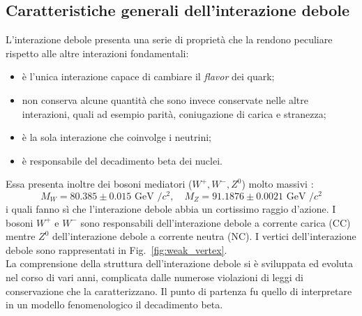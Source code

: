 \documentclass{subnucbo}
\begin{document}
\subsection{Caratteristiche generali dell'interazione debole}
L'interazione debole presenta una serie di proprietà che la rendono peculiare rispetto alle altre interazioni fondamentali:
\begin{itemize}
        \item è l'unica interazione capace di cambiare il \textit{flavor} dei quark;
        \item non conserva alcune quantità che sono invece conservate nelle altre interazioni, quali ad esempio parità, coniugazione di carica e stranezza;
        \item è la sola interazione che coinvolge i neutrini;
        \item è responsabile del decadimento beta dei nuclei.
\end{itemize}
Essa presenta inoltre dei bosoni mediatori ($W^{+}, W^{-}, Z^{0}$) molto massivi \cite{ref:PDG}:
\begin{equation}
        M _ { W } = 80.385 \pm 0.015 \text { GeV } / c ^ { 2 } , \quad M _ { Z } = 91.1876 \pm 0.0021 \text { GeV } / c ^ { 2 }
        \label{eq:bosons_masses}
\end{equation}
i quali fanno sì che l'interazione debole abbia un cortissimo raggio d'azione. I bosoni $W^{+}$ e $W^{-}$ sono responsabili dell'interazione debole a corrente carica (CC) mentre $Z^{0}$ dell'interazione debole a corrente neutra (NC). I vertici dell'interazione debole sono rappresentati in Fig.~\ref{fig:weak_vertex}. \\
La comprensione della struttura dell'interazione debole si è sviluppata ed evoluta nel corso di vari anni, complicata dalle numerose violazioni di leggi di conservazione che la caratterizzano. Il punto di partenza fu quello di interpretare in un modello fenomenologico il decadimento beta.
\end{document}
